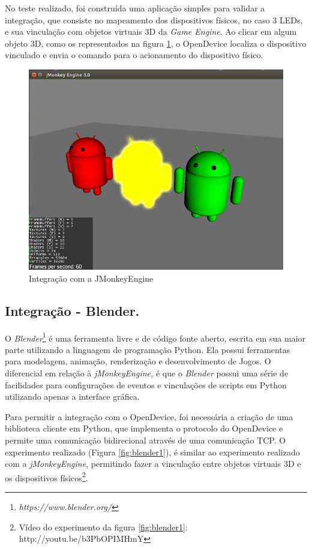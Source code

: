 No teste realizado, foi construída uma aplicação simples para validar
a integração, que consiste no mapeamento dos dispositivos físicos,
no caso 3 LEDs, e sua vinculação com objetos virtuais 3D da \emph{Game
Engine}. Ao clicar em algum objeto 3D, como os representados na figura
\ref{fig:jmonkey}, o OpenDevice localiza o dispositivo vinculado
e envia o comando para o acionamento do dispositivo físico.

\begin{figure}
\begin{centering}
\includegraphics[width=0.8\linewidth]{Imagens/Cap_4/JMonkeyEngine}
\par\end{centering}
\caption{Integração com a JMonkeyEngine\label{fig:jmonkey}}
\end{figure}


\subsection{Integração - Blender.}

O \emph{Blender}\footnote{\emph{https://www.blender.org/}} é uma
ferramenta livre e de código fonte aberto, escrita em sua maior parte
utilizando a linguagem de programação Python. Ela possui ferramentas
para modelagem, animação, renderização e desenvolvimento de Jogos.
O diferencial em relação à \emph{jMonkeyEngine,} é que o \emph{Blender}
possui uma série de facilidades para configurações de eventos e vinculações
de scripts em Python utilizando apenas a interface gráfica.

Para permitir a integração com o OpenDevice, foi necessária a criação
de uma biblioteca cliente em Python, que implementa o protocolo do
OpenDevice e permite uma comunicação bidirecional através de uma comunicação
TCP. O experimento realizado (Figura \ref{fig:blender1}), é similar
ao experimento realizado com a \emph{jMonkeyEngine}, permitindo fazer
a vinculação entre objetos virtuais 3D e os dispositivos físicos\footnote{Vídeo do experimento da figura \ref{fig:blender1}: http://youtu.be/b3PbOPIMHmY}.

